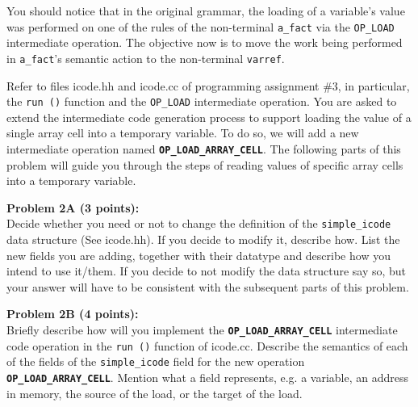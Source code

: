 You should notice that in the original grammar, the loading of a variable's value
was performed on one of the rules of the non-terminal \texttt{a\_fact} via the
\texttt{OP\_LOAD} intermediate operation. The objective now is to move the
work being performed in \texttt{a\_fact}'s semantic action to the non-terminal \texttt{varref}.


Refer to files icode.hh and icode.cc of programming assignment \#3, in particular, the
\texttt{run ()} function and the \texttt{OP\_LOAD} intermediate operation.
You are asked to extend the intermediate code generation process to support loading
the value of a single array cell into a temporary variable. To do so, we will
add a new intermediate operation named {\bf \texttt{OP\_LOAD\_ARRAY\_CELL}}.
The following parts of this problem will guide you through the steps of reading
values of specific array cells into a temporary variable.

\pagebreak

{\bf Problem 2A (3 points):}
\\
Decide whether you need or not to change the definition of the 
\texttt{simple\_icode} data structure (See icode.hh).
If you decide to modify it, describe how. List the new fields you are adding,
  together with their datatype and describe how you intend to use it/them.
If you decide to not modify the data structure say so, but your answer will have to 
be consistent with the subsequent parts of this problem.

\begin{tcolorbox}[height=3in]

\end{tcolorbox}

\vspace{2em}

{\bf Problem 2B (4 points):}
\\
Briefly describe how will you implement 
the {\bf \texttt{OP\_LOAD\_ARRAY\_CELL}} intermediate code operation 
in the \texttt{run ()} function of icode.cc.
Describe the semantics of each of the fields of the \texttt{simple\_icode} field
for the new operation {\bf \texttt{OP\_LOAD\_ARRAY\_CELL}}.
Mention what a field represents, e.g. a variable, an address in memory, the source of the
load, or the target of the load. 

\begin{tcolorbox}[height=3in]

\end{tcolorbox}

\pagebreak

